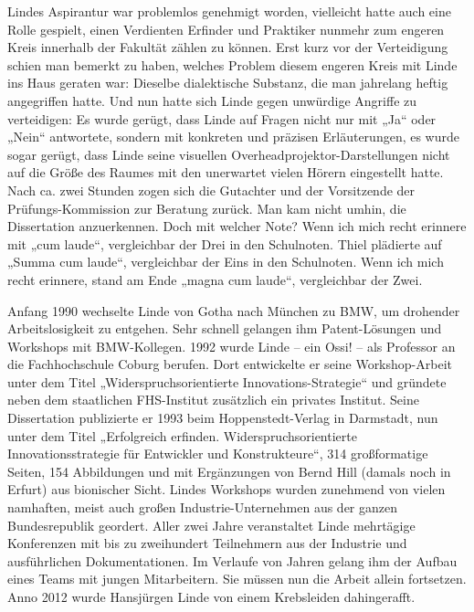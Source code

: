 \documentclass[12pt,a4paper]{article}
\begin{document}
Lindes Aspirantur war problemlos genehmigt worden, vielleicht hatte auch eine
Rolle gespielt, einen Verdienten Erfinder und Praktiker nunmehr zum engeren
Kreis innerhalb der Fakultät zählen zu können. Erst kurz vor der Verteidigung
schien man bemerkt zu haben, welches Problem diesem engeren Kreis mit Linde ins
Haus geraten war: Dieselbe dialektische Substanz, die man jahrelang heftig
angegriffen hatte. Und nun hatte sich Linde gegen unwürdige Angriffe zu
verteidigen: Es wurde gerügt, dass Linde auf Fragen nicht nur mit „Ja“ oder
„Nein“ antwortete, sondern mit konkreten und präzisen Erläuterungen, es wurde
sogar gerügt, dass Linde seine visuellen Overheadprojektor-Darstellungen nicht
auf die Größe des Raumes mit den unerwartet vielen Hörern eingestellt hatte.
Nach ca. zwei Stunden zogen sich die Gutachter und der Vorsitzende der
Prüfungs-Kommission zur Beratung zurück.  Man kam nicht umhin, die Dissertation
anzuerkennen. Doch mit welcher Note? Wenn ich mich recht erinnere mit „cum
laude“, vergleichbar der Drei in den Schulnoten. Thiel plädierte auf „Summa cum
laude“, vergleichbar der Eins in den Schulnoten. Wenn ich mich recht erinnere,
stand am Ende „magna cum laude“, vergleichbar der Zwei.

Anfang 1990 wechselte Linde von Gotha nach München zu BMW, um drohender
Arbeitslosigkeit zu entgehen. Sehr schnell gelangen ihm Patent-Lösungen und
Workshops mit BMW-Kollegen. 1992 wurde Linde – ein Ossi!  -- als Professor an
die Fachhochschule Coburg berufen. Dort entwickelte er seine Workshop-Arbeit
unter dem Titel „Widerspruchsorientierte Innovations-Strategie“ und gründete
neben dem staatlichen FHS-Institut zusätzlich ein privates Institut. Seine
Dissertation publizierte er 1993 beim Hoppenstedt-Verlag in Darmstadt, nun
unter dem Titel „Erfolgreich erfinden.  Widerspruchsorientierte
Innovationsstrategie für Entwickler und Konstrukteure“, 314 großformatige
Seiten, 154 Abbildungen und mit Ergänzungen von Bernd Hill (damals noch in
Erfurt) aus bionischer Sicht.  Lindes Workshops wurden zunehmend von vielen
namhaften, meist auch großen Industrie-Unternehmen aus der ganzen
Bundesrepublik geordert.  Aller zwei Jahre veranstaltet Linde mehrtägige
Konferenzen mit bis zu zweihundert Teilnehmern aus der Industrie und
ausführlichen Dokumentationen. Im Verlaufe von Jahren gelang ihm der Aufbau
eines Teams mit jungen Mitarbeitern. Sie müssen nun die Arbeit allein
fortsetzen.  Anno 2012 wurde Hansjürgen Linde von einem Krebsleiden
dahingerafft.
\end{document}
